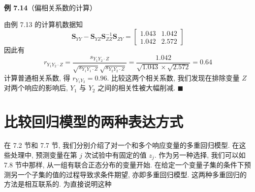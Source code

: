 \noindent\textbf{例 7.14}\quad （偏相关系数的计算）

由例 7.13 的计算机数据知
\[
\mathbf{S}_{YY}-\mathbf{S}_{YZ}\mathbf{S}_{ZZ}^{-1}\mathbf{S}_{ZY}=\left[\begin{array}{cc}1.043&1.042\\1.042&2.572\end{array}\right]
\]
因此有
\label{eq:7-58}
\begin{equation}
r_{Y_1Y_2\cdot Z}=\frac{s_{Y_1Y_2\cdot Z}}{\sqrt{s_{Y_1Y_1\cdot Z}}\sqrt{s_{Y_2Y_2\cdot Z}}}=\frac{1.042}{\sqrt{1.043}\times\sqrt{2.572}}=0.64 \tag{7-58}
\end{equation}
计算普通相关系数, 得 $r_{Y_1Y_2}=0.96$. 比较这两个相关系数, 我们发现在排除变量 $Z$ 对两个响应的影响后, $Y_1$ 与 $Y_2$ 之间的相关性被大幅削减. \hfill$\blacksquare$

\section{比较回归模型的两种表达方式}  %
\label{sec:7.13}

在 7.2 节和 7.7 节, 我们分别介绍了对一个和多个响应变量的多重回归模型. 在这些处理中, 预测变量在第 $j$ 次试验中有固定的值 $z_j$. 作为另一种选择, 我们可以如 7.8 节中那样, 从一组有联合正态分布的变量开始. 在给定一个变量子集的条件下预测另一个子集的值的过程导致求条件期望, 亦即多重回归模型. 这两种多重回归的方法是相互联系的. 为直接说明这种
